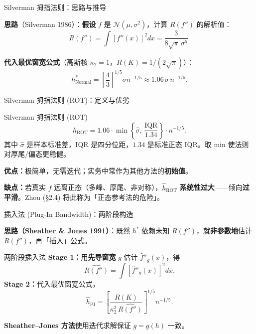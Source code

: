 \documentclass[aspectratio=169, 10pt]{beamer}
\begin{document}
\begin{frame}{Silverman 拇指法则：思路与推导}

  \textbf{思路}（Silverman 1986）：\textbf{假设} $f$ 是 $\mathcal{N}(\mu,\sigma^2)$，计算 $R(f'')$ 的解析值：
  \[
    R(f'') = \int [f''(x)]^2 dx = \frac{3}{8\sqrt{\pi}\, \sigma^5}.
  \]

  \textbf{代入最优窗宽公式}（高斯核 $\kappa_2=1$，$R(K) = 1/(2\sqrt{\pi})$）：
  \[
    h^*_{\text{Normal}} = \left[\frac{4}{3}\right]^{1/5} \sigma n^{-1/5} \approx 1.06\, \sigma\, n^{-1/5}.
  \]

\end{frame}


\begin{frame}{Silverman 拇指法则 (ROT)：定义与优劣}

  \begin{definitionbox}{Silverman 拇指法则 (ROT)}
    \[
      \boxed{\; \hat h_{\text{ROT}} = 1.06 \cdot \min\!\left\{\hat\sigma,\, \frac{\text{IQR}}{1.34}\right\} \cdot n^{-1/5}.\;}
    \]
    其中 $\hat\sigma$ 是样本标准差，IQR 是四分位距，$1.34$ 是标准正态 IQR。取 min 使法则对厚尾/偏态更稳健。
  \end{definitionbox}

  \begin{keybox}
    \textbf{优点：}极简单，无需迭代；实务中常作为其他方法的\textbf{初始值}。

    \textbf{缺点：}若真实 $f$ 远离正态（多峰、厚尾、非对称），$\hat h_{\text{ROT}}$ \textbf{系统性过大}——倾向\textbf{过平滑}。Zhou (§2.4) 将此称为「正态参考法的危险」。
  \end{keybox}

\end{frame}


\begin{frame}{插入法 (Plug-In Bandwidth)：两阶段构造}

  \textbf{思路（Sheather \& Jones 1991）}：既然 $h^*$ 依赖未知 $R(f'')$，就\textbf{非参数地}估计 $R(f'')$，再「插入」公式。

  \begin{definitionbox}{两阶段插入法}
    \textbf{Stage 1：}用\textbf{先导窗宽} $g$ 估计 $\hat f''_{g}(x)$，得
    \[
      \widehat{R(f'')} = \int [\hat f''_g(x)]^2 dx.
    \]
    \textbf{Stage 2：}代入最优窗宽公式，
    \[
      \hat h_{\text{PI}} = \left[\frac{R(K)}{\kappa_2^2\,\widehat{R(f'')}}\right]^{1/5} n^{-1/5}.
    \]
  \end{definitionbox}

  \textbf{Sheather--Jones 方法}使用迭代求解保证 $g = g(h)$ 一致。

\end{frame}
\end{document}
